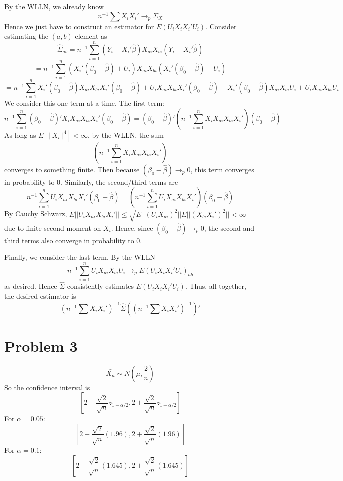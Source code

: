 \documentclass[10pt,letter]{article}
\begin{document}
\begin{enumerate}[label=(\alph*)]
By the WLLN, we already know
\[ n^{-1} \sum X_iX_i' \to_p \Sigma_X \]
Hence we just have to construct an estimator for $E(U_iX_iX_i'U_i)$. Consider estimating the $(a,b)$ element as
\[ \hat{\Sigma}_{ab} = n^{-1} \sum_{i=1}^n (Y_i - X_i'\hat{\beta})X_{ai}X_{bi}(Y_i - X_i'\hat{\beta}) \]
 \[ = n^{-1} \sum_{i=1}^n (X_i'(\beta_0 - \hat{\beta}) + U_i)X_{ai}X_{bi}( X_i'(\beta_0 - \hat{\beta}) + U_i)  \]
  \[ = n^{-1} \sum_{i=1}^n X_i'(\beta_0 - \hat{\beta})X_{ai}X_{bi} X_i'(\beta_0 - \hat{\beta}) + U_iX_{ai}X_{bi}X_i'(\beta_0 - \hat{\beta}) + X_i'(\beta_0 - \hat{\beta})X_{ai}X_{bi}U_i + U_iX_{ai}X_{bi}U_i \]
  We consider this one term at a time. The first term:
  \[ n^{-1} \sum_{i=1}^n (\beta_0 - \hat{\beta})'X_iX_{ai}X_{bi} X_i'(\beta_0 - \hat{\beta}) =(\beta_0 - \hat{\beta})'\left(n^{-1} \sum_{i=1}^n X_iX_{ai}X_{bi} X_i' \right) (\beta_0 - \hat{\beta}) \]
  As long as $E[||X_i||^4] < \infty$, by the WLLN, the sum
  \[\left(n^{-1} \sum_{i=1}^n X_iX_{ai}X_{bi} X_i' \right) \]
  converges to something finite. Then because $(\beta_0 - \hat{\beta}) \to_p 0$, this term converges in probability to 0. Similarly, the second/third terms are
  \[n^{-1} \sum_{i=1}^n U_iX_{ai}X_{bi}X_i'(\beta_0 - \hat{\beta}) = \left(n^{-1} \sum_{i=1}^n U_iX_{ai}X_{bi}X_i' \right)(\beta_0 - \hat{\beta}) \]
  By Cauchy Schwarz, $E||U_iX_{ai}X_{bi}X_i'|| \le \sqrt{E||(U_iX_{ai})^2||E||(X_{bi}X_i')^2||} < \infty$ due to finite second moment on $X_i$. Hence, since $(\beta_0 - \hat{\beta})  \to_p 0$, the second and third terms also converge in probability to 0.

Finally, we consider the last term. By the WLLN
\[n^{-1} \sum_{i=1}^nU_iX_{ai}X_{bi}U_i \to_p E(U_iX_iX_i'U_i)_{ab} \]
as desired. Hence $\hat{\Sigma}$ consistently estimates $E(U_iX_iX_i'U_i)$. Thus, all together, the desired estimator is
\[ \left(n^{-1} \sum X_iX_i' \right)^{-1} \hat{\Sigma}\left(\left(n^{-1} \sum X_iX_i' \right)^{-1}\right)' \]
\end{enumerate}
\section*{Problem 3}
\[ \bar{X_n} \sim N(\mu, \frac{2}{n}) \]
So the confidence interval is
\[ \left[ 2 - \frac{\sqrt{2}}{\sqrt{n}}z_{1-\alpha/2}, 2 + \frac{\sqrt{2}}{\sqrt{n}}z_{1-\alpha/2} \right] \]
For $\alpha = 0.05$:
\[ \left[ 2 - \frac{\sqrt{2}}{\sqrt{n}}(1.96), 2 + \frac{\sqrt{2}}{\sqrt{n}}(1.96) \right] \]
For $\alpha = 0.1$:
\[ \left[ 2- \frac{\sqrt{2}}{\sqrt{n}}(1.645), 2 + \frac{\sqrt{2}}{\sqrt{n}}(1.645) \right] \]
\end{document}

